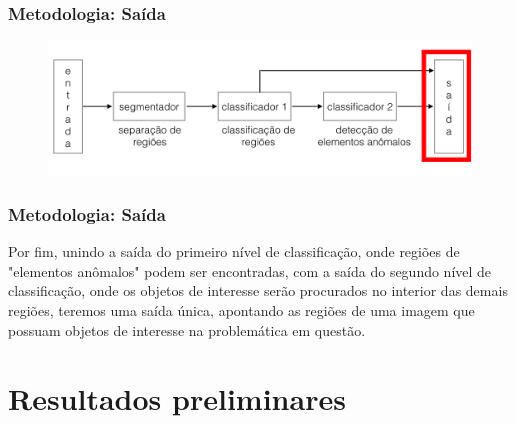 \documentclass[t]{beamer}
\begin{document}
\begin{frame}[c]
	\frametitle{Metodologia: Saída}
	\begin{figure}[h]
    	\includegraphics[width=\textwidth]{imgs/arquitetura_4}
	\end{figure}
\end{frame}

\begin{frame}
	\frametitle{Metodologia: Saída}

	Por fim, unindo a saída do primeiro nível de classificação, onde regiões de "elementos anômalos" podem ser encontradas, com a saída do segundo nível de classificação, onde os objetos de interesse serão procurados no interior das demais regiões, teremos uma saída única, apontando as regiões de uma imagem que possuam objetos de interesse na problemática em questão.

\end{frame}


\section{Resultados preliminares}
\end{document}
